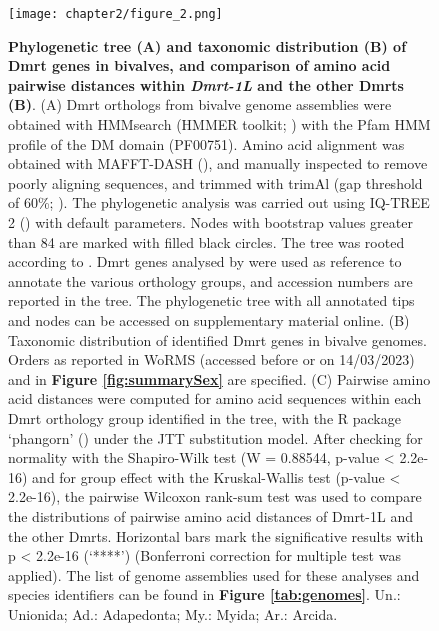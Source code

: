 \documentclass[../main.tex]{subfiles}
\begin{document}
\begin{figure}
    \centering
    \texttt{[image: chapter2/figure\_2.png]}
    \captionsetup{width=\textwidth}
    \caption{
    \textbf{Phylogenetic tree (A) and taxonomic distribution (B) of Dmrt genes in bivalves, and comparison of amino acid pairwise distances within \textit{Dmrt-1L} and the other Dmrts (B)}. (A) Dmrt orthologs from bivalve genome assemblies were obtained with HMMsearch (HMMER toolkit; \textbf{\cite{eddy2011accelerated}}) with the Pfam HMM profile of the DM domain (PF00751). Amino acid alignment was obtained with MAFFT-DASH (\textbf{\cite{rozewicki2019mafft}}), and manually inspected to remove poorly aligning sequences, and trimmed with trimAl (gap threshold of 60\%; \textbf{\cite{capella2009trimal}}). The phylogenetic analysis was carried out using IQ-TREE 2 (\textbf{\cite{minh2020iq}}) with default parameters. Nodes with bootstrap values greater than 84 are marked with filled black circles. The tree was rooted according to \textbf{\cite{evensen2022comparative}}. Dmrt genes analysed by \textbf{\cite{evensen2022comparative}} were used as reference to annotate the various orthology groups, and accession numbers are reported in the tree. The phylogenetic tree with all annotated tips and nodes can be accessed on supplementary material online. (B) Taxonomic distribution of identified Dmrt genes in bivalve genomes. Orders as reported in WoRMS (accessed before or on 14/03/2023) and in \textbf{Figure \ref{fig:summarySex}} are specified. (C) Pairwise amino acid distances were computed for amino acid sequences within each Dmrt orthology group identified in the tree, with the R package ‘phangorn’ (\textbf{\cite{schliep2011phangorn}}) under the JTT substitution model. After checking for normality with the Shapiro-Wilk test (W = 0.88544, p-value < 2.2e-16) and for group effect with the Kruskal-Wallis test (p-value < 2.2e-16), the pairwise Wilcoxon rank-sum test was used to compare the distributions of pairwise amino acid distances of Dmrt-1L and the other Dmrts. Horizontal bars mark the significative results with p < 2.2e-16 (‘****’) (Bonferroni correction for multiple test was applied). The list of genome assemblies used for these analyses and species identifiers can be found in \textbf{Figure \ref{tab:genomes}}. Un.: Unionida; Ad.: Adapedonta; My.: Myida; Ar.: Arcida.
    }
    
    \label{fig:dmrt}
\end{figure}
\end{document}
